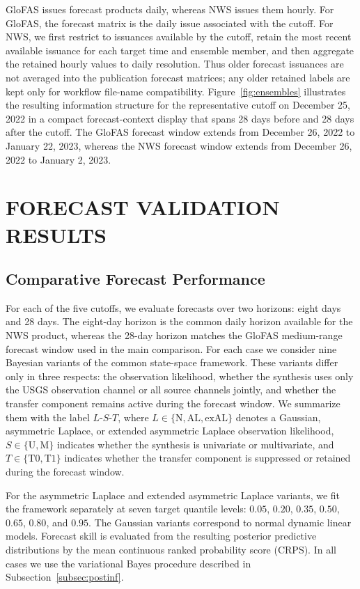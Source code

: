 \documentclass[APA,STIX1COL]{WileyNJD-v2}
\begin{document}
GloFAS issues forecast products daily, whereas NWS issues them hourly. For GloFAS, the forecast matrix is the daily issue associated with the cutoff. For NWS, we first restrict to issuances available by the cutoff, retain the most recent available issuance for each target time and ensemble member, and then aggregate the retained hourly values to daily resolution. Thus older forecast issuances are not averaged into the publication forecast matrices; any older retained labels are kept only for workflow file-name compatibility. Figure~\ref{fig:ensembles} illustrates the resulting information structure for the representative cutoff on December 25, 2022 in a compact forecast-context display that spans 28 days before and 28 days after the cutoff. The GloFAS forecast window extends from December 26, 2022 to January 22, 2023, whereas the NWS forecast window extends from December 26, 2022 to January 2, 2023.
\section{FORECAST VALIDATION RESULTS}
\label{sec:forecastvalidation}

\subsection{Comparative Forecast Performance}
\label{subsec:benchmarkresults}

For each of the five cutoffs, we evaluate forecasts over two horizons: eight days and 28 days. The eight-day horizon is the common daily horizon available for the NWS product, whereas the 28-day horizon matches the GloFAS medium-range forecast window used in the main comparison. For each case we consider nine Bayesian variants of the common state-space framework. These variants differ only in three respects: the observation likelihood, whether the synthesis uses only the USGS observation channel or all source channels jointly, and whether the transfer component remains active during the forecast window. We summarize them with the label \(L\)-\(S\)-\(T\), where \(L\in\{\mathrm{N},\mathrm{AL},\mathrm{exAL}\}\) denotes a Gaussian, asymmetric Laplace, or extended asymmetric Laplace observation likelihood, \(S\in\{\mathrm{U},\mathrm{M}\}\) indicates whether the synthesis is univariate or multivariate, and \(T\in\{\mathrm{T0},\mathrm{T1}\}\) indicates whether the transfer component is suppressed or retained during the forecast window.

For the asymmetric Laplace and extended asymmetric Laplace variants, we fit the framework separately at seven target quantile levels: \(0.05\), \(0.20\), \(0.35\), \(0.50\), \(0.65\), \(0.80\), and \(0.95\). The Gaussian variants correspond to normal dynamic linear models. Forecast skill is evaluated from the resulting posterior predictive distributions by the mean continuous ranked probability score (CRPS). In all cases we use the variational Bayes procedure described in Subsection~\ref{subsec:postinf}.
\end{document}
